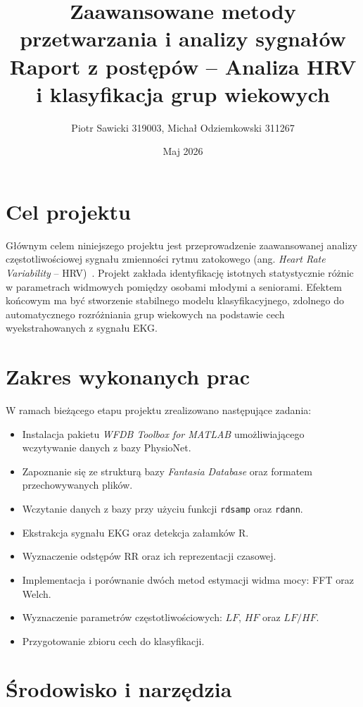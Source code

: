 \documentclass[a4paper,12pt]{article}
\title{
\Large Zaawansowane metody przetwarzania i analizy sygnałów \\[6pt]
\textbf{Raport z postępów – Analiza HRV i klasyfikacja grup wiekowych}
}
\author{Piotr Sawicki 319003, Michał Odziemkowski 311267}
\date{Maj 2026}
\begin{document}
\maketitle


\section{Cel projektu}
Głównym celem niniejszego projektu jest przeprowadzenie zaawansowanej analizy częstotliwościowej sygnału zmienności rytmu zatokowego (ang. \textit{Heart Rate Variability} – HRV)~. Projekt zakłada identyfikację istotnych statystycznie różnic w parametrach widmowych pomiędzy osobami młodymi a seniorami. Efektem końcowym ma być stworzenie stabilnego modelu klasyfikacyjnego, zdolnego do automatycznego rozróżniania grup wiekowych na podstawie cech wyekstrahowanych z sygnału EKG.


\section{Zakres wykonanych prac}

W ramach bieżącego etapu projektu zrealizowano następujące zadania:

\begin{itemize}
    \item Instalacja pakietu \textit{WFDB Toolbox for MATLAB} umożliwiającego wczytywanie danych z bazy PhysioNet.
    \item Zapoznanie się ze strukturą bazy \textit{Fantasia Database} oraz formatem przechowywanych plików.
    \item Wczytanie danych z bazy przy użyciu funkcji \texttt{rdsamp} oraz \texttt{rdann}.
    \item Ekstrakcja sygnału EKG oraz detekcja załamków R.
    \item Wyznaczenie odstępów RR oraz ich reprezentacji czasowej.
    \item Implementacja i porównanie dwóch metod estymacji widma mocy: FFT oraz Welch.
    \item Wyznaczenie parametrów częstotliwościowych: $LF$, $HF$ oraz $LF/HF$.
    \item Przygotowanie zbioru cech do klasyfikacji.
\end{itemize}


\section{Środowisko i narzędzia}
\end{document}
